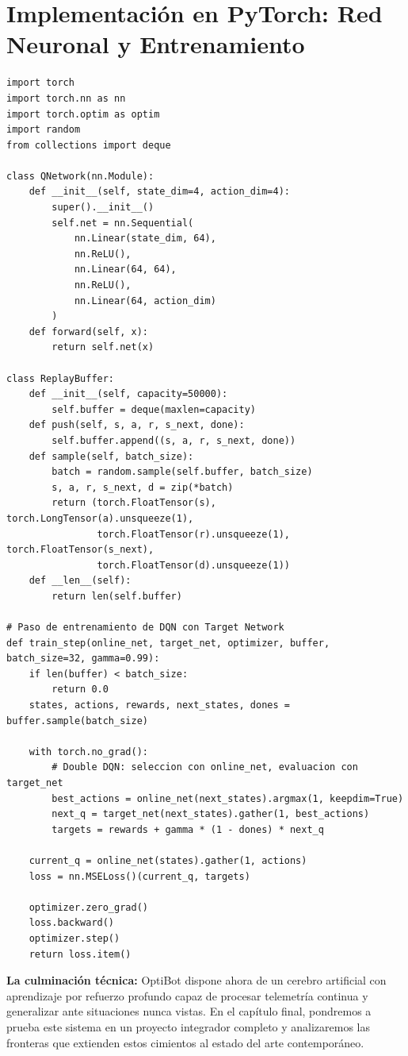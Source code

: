 \section{Implementación en PyTorch: Red Neuronal y Entrenamiento}
\begin{lstlisting}[style=rlcode]
import torch
import torch.nn as nn
import torch.optim as optim
import random
from collections import deque

class QNetwork(nn.Module):
    def __init__(self, state_dim=4, action_dim=4):
        super().__init__()
        self.net = nn.Sequential(
            nn.Linear(state_dim, 64),
            nn.ReLU(),
            nn.Linear(64, 64),
            nn.ReLU(),
            nn.Linear(64, action_dim)
        )
    def forward(self, x):
        return self.net(x)

class ReplayBuffer:
    def __init__(self, capacity=50000):
        self.buffer = deque(maxlen=capacity)
    def push(self, s, a, r, s_next, done):
        self.buffer.append((s, a, r, s_next, done))
    def sample(self, batch_size):
        batch = random.sample(self.buffer, batch_size)
        s, a, r, s_next, d = zip(*batch)
        return (torch.FloatTensor(s), torch.LongTensor(a).unsqueeze(1),
                torch.FloatTensor(r).unsqueeze(1), torch.FloatTensor(s_next),
                torch.FloatTensor(d).unsqueeze(1))
    def __len__(self):
        return len(self.buffer)

# Paso de entrenamiento de DQN con Target Network
def train_step(online_net, target_net, optimizer, buffer, batch_size=32, gamma=0.99):
    if len(buffer) < batch_size:
        return 0.0
    states, actions, rewards, next_states, dones = buffer.sample(batch_size)
    
    with torch.no_grad():
        # Double DQN: seleccion con online_net, evaluacion con target_net
        best_actions = online_net(next_states).argmax(1, keepdim=True)
        next_q = target_net(next_states).gather(1, best_actions)
        targets = rewards + gamma * (1 - dones) * next_q
        
    current_q = online_net(states).gather(1, actions)
    loss = nn.MSELoss()(current_q, targets)
    
    optimizer.zero_grad()
    loss.backward()
    optimizer.step()
    return loss.item()
\end{lstlisting}

\begin{notabox}
\textbf{La culminación técnica:} OptiBot dispone ahora de un cerebro artificial con aprendizaje por refuerzo profundo capaz de procesar telemetría continua y generalizar ante situaciones nunca vistas. En el capítulo final, pondremos a prueba este sistema en un proyecto integrador completo y analizaremos las fronteras que extienden estos cimientos al estado del arte contemporáneo.
\end{notabox}
